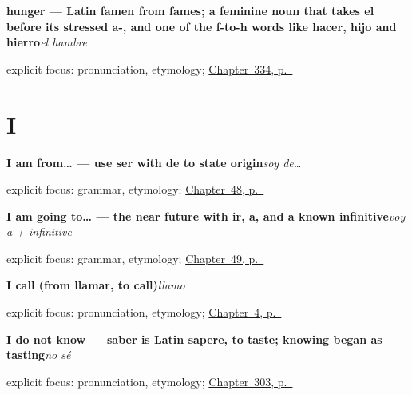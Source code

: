 \noindent\begin{minipage}[t]{\linewidth}
\raggedright
\textbf{hunger — Latin famen from fames; a feminine noun that takes el before its stressed a-, and one of the f-to-h words like hacer, hijo and hierro}\enspace\emph{el hambre}\par
\footnotesize explicit focus: pronunciation, etymology; \hyperref[ch:salud-y-edad]{Chapter~334, p.~\pageref*{ch:salud-y-edad}}
\end{minipage}\par\smallskip

\section*{I}

\noindent\begin{minipage}[t]{\linewidth}
\raggedright
\textbf{I am from… — use ser with de to state origin}\enspace\emph{soy de…}\par
\footnotesize explicit focus: grammar, etymology; \hyperref[ch:ser-y-estar]{Chapter~48, p.~\pageref*{ch:ser-y-estar}}
\end{minipage}\par\smallskip

\noindent\begin{minipage}[t]{\linewidth}
\raggedright
\textbf{I am going to… — the near future with ir, a, and a known infinitive}\enspace\emph{voy a + infinitive}\par
\footnotesize explicit focus: grammar, etymology; \hyperref[ch:ir-y-futuro]{Chapter~49, p.~\pageref*{ch:ir-y-futuro}}
\end{minipage}\par\smallskip

\noindent\begin{minipage}[t]{\linewidth}
\raggedright
\textbf{I call (from llamar, to call)}\enspace\emph{llamo}\par
\footnotesize explicit focus: pronunciation, etymology; \hyperref[ch:your-name]{Chapter~4, p.~\pageref*{ch:your-name}}
\end{minipage}\par\smallskip

\noindent\begin{minipage}[t]{\linewidth}
\raggedright
\textbf{I do not know — saber is Latin sapere, to taste; knowing began as tasting}\enspace\emph{no sé}\par
\footnotesize explicit focus: pronunciation, etymology; \hyperref[ch:reparaciones]{Chapter~303, p.~\pageref*{ch:reparaciones}}
\end{minipage}\par\smallskip

